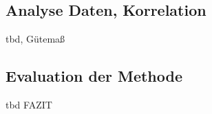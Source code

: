 \subsection{Analyse Daten, Korrelation}
tbd,  Gütemaß


\subsection{Evaluation der Methode}
tbd FAZIT

